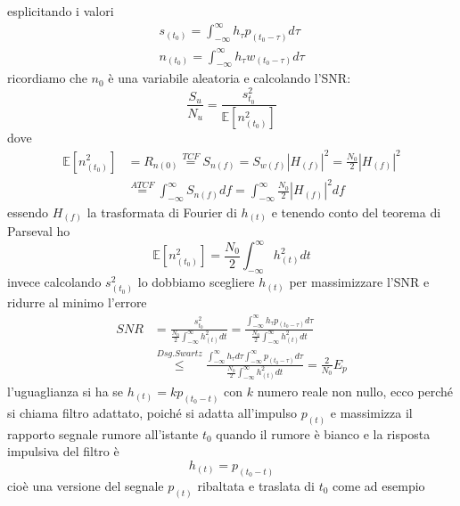         esplicitando i valori
        \begin{gather}
            s_{(t_0)} = \int_{-\infty}^{\infty} h_{\tau} p_{(t_0-\tau)}d\tau \nonumber\\
            n_{(t_0)} = \int_{-\infty}^{\infty} h_{\tau} w_{(t_0-\tau)}d\tau \nonumber
        \end{gather}
        ricordiamo che $n_0$ è una variabile aleatoria e calcolando l'SNR:
        \[
            \frac{S_u}{N_u} = \frac{s^2_{t_0}}{\mathbb{E}[n^2_{(t_0)}]}  
        \]
        dove 
        \begin{align}
            \mathbb{E}[n^2_{(t_0)}] &= R_{n(0)} \overset{TCF}{=} S_{n(f)} = S_{w(f)}\left|H_{(f)}\right|^2 = \frac{N_0}{2}\left|H_{(f)}\right|^2 \nonumber \\
                                    &\overset{ATCF}{=} \int_{-\infty}^{\infty} S_{n(f)} df = \int_{-\infty}^{\infty} \frac{N_0}{2}\left|H_{(f)}\right|^2 df \nonumber            
        \end{align}
        essendo $H_{(f)}$ la trasformata di Fourier di $h_{(t)}$ e tenendo conto del teorema di Parseval ho
        \[
            \mathbb{E}[n^2_{(t_0)}] = \frac{N_0}{2}\int_{-\infty}^{\infty} h_{(t)}^2 dt
        \]
        invece calcolando $s^2_{(t_0)}$ lo dobbiamo scegliere $h_{(t)}$ per massimizzare l'SNR e ridurre al minimo l'errore
        \begin{align}
            SNR &= \frac{s^2_{t_0}}{\frac{N_0}{2}\int_{-\infty}^{\infty} h_{(t)}^2 dt} = \frac{\int_{-\infty}^{\infty} h_{\tau} p_{(t_0-\tau)}d\tau}{\frac{N_0}{2}\int_{-\infty}^{\infty} h_{(t)}^2 dt} \nonumber \\
                &\overset{Dsg. Swartz}{\leq} \frac{\int_{-\infty}^{\infty} h_{\tau}d\tau \int_{-\infty}^{\infty} p_{(t_0-\tau)}d\tau}{\frac{N_0}{2}\int_{-\infty}^{\infty} h_{(t)}^2 dt} = \frac{2}{N_0}E_p \nonumber
        \end{align}        
        l'uguaglianza si ha se $h_{(t)} = kp_{(t_0-t)}$ con $k$ numero reale non nullo, ecco perché si chiama filtro adattato, poiché si adatta all'impulso $p_{(t)}$ e 
        massimizza il rapporto segnale rumore all'istante $t_0$ quando il rumore è bianco e la risposta impulsiva del filtro è 
        \[
            h_{(t)} = p_{(t_0-t)}  
        \]     
        cioè una versione del segnale $p_{(t)}$ ribaltata e traslata di $t_{0}$ come ad esempio 
